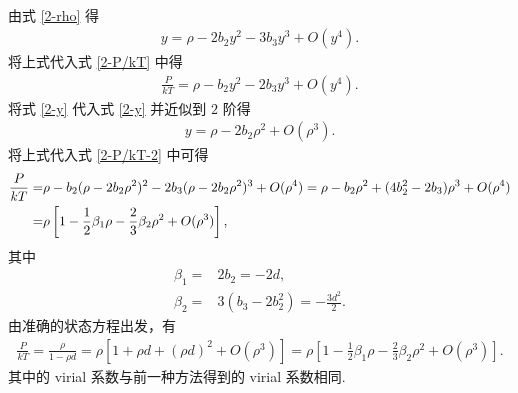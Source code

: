 \documentclass{assignment}
\begin{document}
\begin{sol}
\begin{align}
    \end{align}
    由式 \eqref{2-rho} 得
    \begin{align}
        \label{2-y}
        y=\rho-2b_2y^2-3b_3y^3+O(y^4).
    \end{align}
    将上式代入式 \eqref{2-P/kT} 中得
    \begin{align}
        \label{2-P/kT-2}
        \frac{P}{kT}=\rho-b_2y^2-2b_3y^3+O(y^4).
    \end{align}
    将式 \eqref{2-y} 代入式 \eqref{2-y} 并近似到 $2$ 阶得
    \begin{align}
        y=\rho-2b_2\rho^2+O(\rho^3).
    \end{align}
    将上式代入式 \eqref{2-P/kT-2} 中可得
    \begin{align}
        \notag\frac{P}{kT}=&\rho-b_2(\rho-2b_2\rho^2)^2-2b_3(\rho-2b_2\rho^2)^3+O(\rho^4)=\rho-b_2\rho^2+(4b_2^2-2b_3)\rho^3+O(\rho^4)\\
        =&\rho\left[1-\frac{1}{2}\beta_1\rho-\frac{2}{3}\beta_2\rho^2+O(\rho^3)\right],
    \end{align}
    其中
    \begin{align}
        \beta_1=&2b_2=-2d,\\
        \beta_2=&3(b_3-2b_2^2)=-\frac{3d^2}{2}.
    \end{align}
    由准确的状态方程出发，有
    \begin{align}
        \frac{P}{kT}=\frac{\rho}{1-\rho d}=\rho\left[1+\rho d+(\rho d)^2+O(\rho^3)\right]=\rho\left[1-\frac{1}{2}\beta_1\rho-\frac{2}{3}\beta_2\rho^2+O(\rho^3)\right].
    \end{align}
    其中的 virial 系数与前一种方法得到的 virial 系数相同.
\end{sol}
\end{document}
